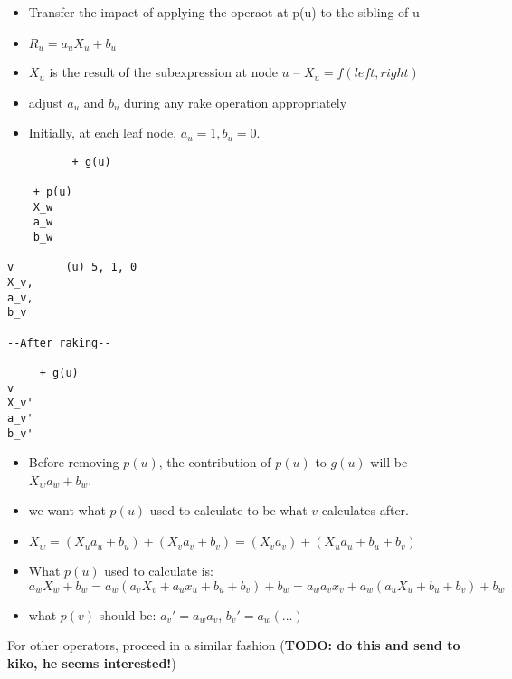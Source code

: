 \begin{itemize}
    \item Transfer the impact of applying the operaot at p(u) to the sibling of u
    \item $R_u = a_u X_u + b_u$
    \item $X_u$ is the result of the subexpression at node $u$ -- $X_u = f(left, right)$
    \item adjust $a_u$ and $b_u$ during any rake operation appropriately
    \item Initially, at each leaf node, $a_u = 1, b_u = 0$.
\end{itemize}



\begin{verbatim}
          + g(u)
  
    + p(u) 
    X_w
    a_w
    b_w

v        (u) 5, 1, 0
X_v,
a_v,
b_v

--After raking--

     + g(u)
v
X_v'
a_v'
b_v'
\end{verbatim}

\begin{itemize}
    \item Before removing $p(u)$, the contribution of $p(u)$ to $g(u)$ will be $X_w a_w + b_w$.
    \item we want what $p(u)$ used to calculate to be what $v$ calculates after.
    \item $X_w = (X_u a_u + b_u) + (X_v a_v + b_v)= (X_v a_v) + (X_u a_u + b_u + b_v)$
    \item What $p(u)$ used to calculate is: $a_w X_w + b_w = a_w (a_v X_v + a_u x_u + b_u + b_v) + b_w = a_w a_v x_v + a_w (a_u X_u + b_u + b_v) + b_w$
    \item what $p(v)$ should be: $a_v' = a_w a_v$, $b_v' = a_w (\dots)$
\end{itemize}

For other operators, proceed in a similar fashion (\textbf{TODO: do this and send to kiko, he seems interested!})

